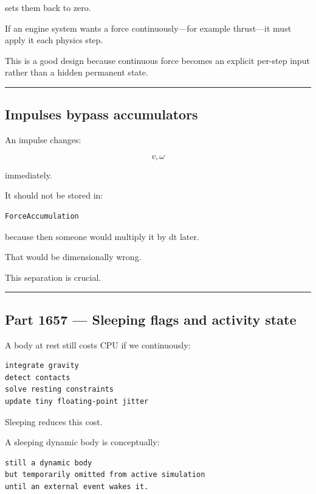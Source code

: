 sets them back to zero.

If an engine system wants a force continuously---for example thrust---it must apply it each physics step.

This is a good design because continuous force becomes an explicit per-step input rather than a hidden permanent state.

\begin{center}\rule{0.5\linewidth}{0.5pt}\end{center}

\subsection{Impulses bypass accumulators}\label{06-engine-ii-ch037-impulses-bypass-accumulators}

An impulse changes:

\[
v,\omega
\]

immediately.

It should not be stored in:

\begin{verbatim}
ForceAccumulation
\end{verbatim}

because then someone would multiply it by dt later.

That would be dimensionally wrong.

This separation is crucial.

\begin{center}\rule{0.5\linewidth}{0.5pt}\end{center}

\subsection{Part 1657 --- Sleeping flags and activity state}\label{06-engine-ii-ch037-part-1657-sleeping-flags-and-activity-state}

A body at rest still costs CPU if we continuously:

\begin{verbatim}
integrate gravity
detect contacts
solve resting constraints
update tiny floating-point jitter
\end{verbatim}

Sleeping reduces this cost.

A sleeping dynamic body is conceptually:

\begin{verbatim}
still a dynamic body
but temporarily omitted from active simulation
until an external event wakes it.
\end{verbatim}

